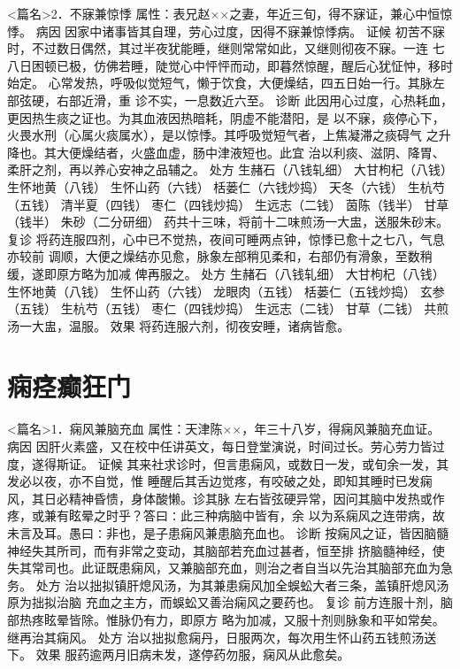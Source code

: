 \documentclass[a4paper,12pt,UTF8,twoside]{ctexbook}
\begin{document}
<篇名>2．不寐兼惊悸
属性：表兄赵××之妻，年近三旬，得不寐证，兼心中恒惊悸。 
病因 因家中诸事皆其自理，劳心过度，因得不寐兼惊悸病。 
证候 初苦不寐时，不过数日偶然，其过半夜犹能睡，继则常常如此，又继则彻夜不寐。一连 
七八日困顿已极，仿佛若睡，陡觉心中怦怦而动，即暮然惊醒，醒后心犹怔忡，移时始定。 
心常发热，呼吸似觉短气，懒于饮食，大便燥结，四五日始一行。其脉左部弦硬，右部近滑，重 
诊不实，一息数近六至。 
诊断 此因用心过度，心热耗血，更因热生痰之证也。为其血液因热暗耗，阴虚不能潜阳，是 
以不寐，痰停心下，火畏水刑（心属火痰属水），是以惊悸。其呼吸觉短气者，上焦凝滞之痰碍气 
之升降也。其大便燥结者，火盛血虚，肠中津液短也。此宜 
治以利痰、滋阴、降胃、柔肝之剂，再以养心安神之品辅之。 
处方 生赭石（八钱轧细） 大甘枸杞（八钱） 生怀地黄（八钱） 生怀山药（六钱） 
栝蒌仁（六钱炒捣） 天冬（六钱） 生杭芍（五钱） 清半夏（四钱） 
枣仁（四钱炒捣） 生远志（二钱） 茵陈（钱半） 甘草（钱半） 朱砂（二分研细） 
药共十三味，将前十二味煎汤一大盅，送服朱砂末。 
复诊 将药连服四剂，心中已不觉热，夜间可睡两点钟，惊悸已愈十之七八，气息亦较前 
调顺，大便之燥结亦见愈，脉象左部稍见柔和，右部仍有滑象，至数稍缓，遂即原方略为加减 
俾再服之。 
处方 生赭石（八钱轧细） 大甘枸杞（八钱） 生怀地黄（八钱） 生怀山药（六钱） 
龙眼肉（五钱） 栝蒌仁（五钱炒捣） 玄参（五钱） 生杭芍（五钱） 
枣仁（四钱炒捣） 生远志（二钱） 甘草（二钱） 
共煎汤一大盅，温服。 
效果 将药连服六剂，彻夜安睡，诸病皆愈。 

\chapter{痫痉癫狂门}
<篇名>1．痫风兼脑充血
属性：天津陈××，年三十八岁，得痫风兼脑充血证。 
病因 因肝火素盛，又在校中任讲英文，每日登堂演说，时间过长。劳心劳力皆过度，遂得斯证。 
证候 其来社求诊时，但言患痫风，或数日一发，或旬余一发，其发必以夜，亦不自觉，惟 
睡醒后其舌边觉疼，有咬破之处，即知其睡时已发痫风，其日必精神昏愦，身体酸懒。诊其脉 
左右皆弦硬异常，因问其脑中发热或作疼，或兼有眩晕之时乎？答曰∶此三种病脑中皆有，余 
以为系痫风之连带病，故未言及耳。愚曰∶非也，是子患痫风兼患脑充血也。 
诊断 按痫风之证，皆因脑髓神经失其所司，而有非常之变动，其脑部若充血过甚者，恒至排 
挤脑髓神经，使失其常司也。此证既患痫风，又兼脑部充血，则治之者自当以先治其脑部充血为急务。 
处方 治以拙拟镇肝熄风汤，为其兼患痫风加全蜈蚣大者三条，盖镇肝熄风汤原为拙拟治脑 
充血之主方，而蜈蚣又善治痫风之要药也。 
复诊 前方连服十剂，脑部热疼眩晕皆除。惟脉仍有力，即原方 
略为加减，又服十剂则脉象和平如常矣。继再治其痫风。 
处方 治以拙拟愈痫丹，日服两次，每次用生怀山药五钱煎汤送下。 
效果 服药逾两月旧病未发，遂停药勿服，痫风从此愈矣。 
\end{document}
